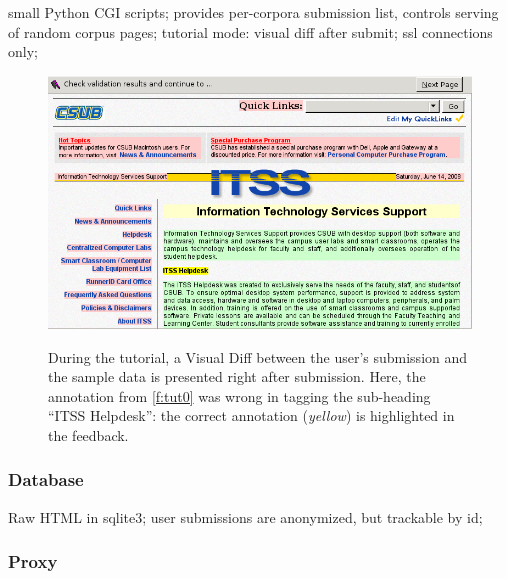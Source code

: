 small Python CGI scripts;
provides per-corpora submission list,
controls serving of random corpus pages;
tutorial mode: visual diff after submit;
ssl connections only;

\begin{figure}
	{\includegraphics[width=\textwidth]{tut1}}
\caption{\label{f:tut1}During the tutorial, a Visual Diff between the user's submission and the sample data is presented right after submission.
	Here, the annotation from \ref{f:tut0} was wrong in tagging the sub-heading ``ITSS Helpdesk'': the correct annotation (\textit{yellow}) is highlighted in the feedback.}
\end{figure}

\subsubsection{Database}

Raw HTML in sqlite3;
user submissions are anonymized, but trackable by id;

\subsubsection{Proxy}

